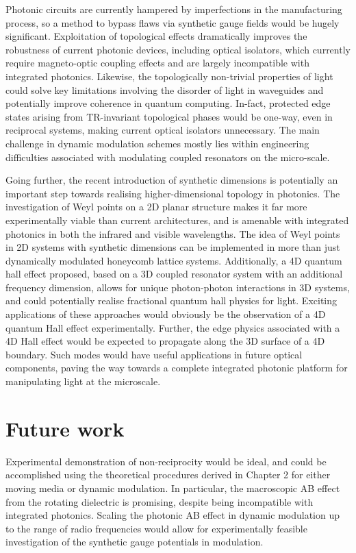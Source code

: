 Photonic circuits are currently hampered by imperfections in the manufacturing process, so a method to bypass flaws via synthetic gauge fields would be hugely significant. Exploitation of topological effects dramatically improves the robustness of current photonic devices, including optical isolators, which currently require magneto-optic coupling effects and are largely incompatible with integrated photonics. Likewise, the topologically non-trivial properties of light could solve key limitations involving the disorder of light in waveguides and potentially improve coherence in quantum computing.  In-fact, protected edge states arising from TR-invariant topological phases would be one-way, even in reciprocal systems, making current optical isolators unnecessary. The main challenge in dynamic modulation schemes mostly lies within engineering difficulties associated with modulating coupled resonators on the micro-scale. 

Going further, the recent introduction of synthetic dimensions is potentially an important step towards realising higher-dimensional topology in photonics. The investigation of Weyl points on a 2D planar structure makes it far more experimentally viable than current architectures, and is amenable with integrated photonics in both the infrared and visible wavelengths. The idea of Weyl points in 2D systems with synthetic dimensions can be implemented in more than just dynamically modulated honeycomb lattice systems. Additionally, a 4D quantum hall effect proposed, based on a 3D coupled resonator system with an additional frequency dimension, allows for unique photon-photon interactions in 3D  systems, and could potentially realise fractional quantum hall physics for light. Exciting applications of these approaches would obviously be the observation of a 4D quantum Hall effect experimentally. Further, the edge physics associated with a 4D Hall effect would be expected to propagate along the 3D surface of a 4D boundary. Such modes would have useful applications in future optical components, paving the way towards a complete integrated photonic platform for manipulating light at the microscale. 


\chapter*{Future work}
Experimental demonstration of non-reciprocity would be ideal, and could be accomplished using the theoretical procedures derived in Chapter 2 for either moving media or dynamic modulation. In particular, the macroscopic AB effect from the rotating dielectric is promising, despite being incompatible with integrated photonics. Scaling the photonic AB effect in dynamic modulation up to the range of radio frequencies would allow for experimentally feasible investigation of the synthetic gauge potentials in modulation.

